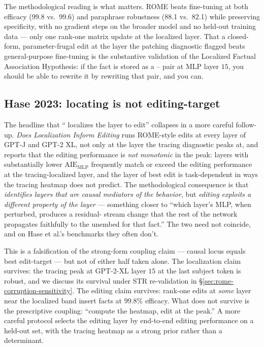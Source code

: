 The methodological reading is what matters. ROME beats fine-tuning at
both efficacy (99.8 vs.\ 99.6) and paraphrase robustness (88.1 vs.\
82.1) while preserving specificity, with no gradient steps on the
broader model and no held-out training data --- only one rank-one
matrix update at the localized layer. That a closed-form,
parameter-frugal edit at the layer the patching diagnostic flagged
beats general-purpose fine-tuning is the substantive validation of
the Localized Factual Association Hypothesis: if the fact is stored
as a \glsterm{key}{key}--\glsterm{value}{value} pair at MLP layer $15$, you should be able to rewrite
it by rewriting that pair, and you can.

\subsection{Hase 2023: locating is not editing-target}
\label{sec:rome-hase-critique}

The headline that `` localizes the layer to edit''
collapses in a more careful follow-up.
\emph{Does Localization Inform Editing} runs ROME-style edits at every
layer of GPT-J and GPT-2 XL, not only at the layer the tracing
diagnostic peaks at, and reports that the editing performance is
\emph{not monotonic} in the  peak: layers with substantially lower
$\mathrm{AIE}_{\mathrm{MLP}}$ frequently match or exceed the
editing performance at the tracing-localized layer, and the layer of
best edit is task-dependent in ways the tracing heatmap does not
predict. The methodological consequence is that \emph{
identifies layers that are causal mediators of the behavior}, but
\emph{editing exploits a different property of the layer} --- something
closer to ``which layer's MLP, when perturbed, produces a residual-%
stream change that the rest of the network propagates faithfully to
the unembed for that fact.'' The two need not coincide, and on
Hase et al.'s benchmarks they often don't.

This is a falsification of the strong-form coupling claim --- causal
locus equals best edit-target --- but not of either half taken alone.
The localization claim survives: the tracing peak at GPT-2-XL layer
$15$ at the last subject token is robust, and we discuss its survival
under STR re-validation in \S\ref{sec:rome-corruption-sensitivity}.
The editing claim survives: rank-one edits at \emph{some} layer near
the localized band insert facts at 99.8\% efficacy. What does not
survive is the prescriptive coupling: ``compute the  heatmap, edit
at the peak.'' A more careful protocol selects the editing layer by
end-to-end editing performance on a held-out set, with the tracing
heatmap as a strong prior rather than a determinant.

